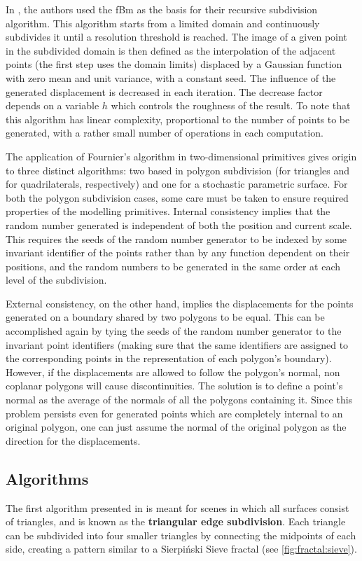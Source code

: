 \documentclass{acmtog}
\begin{document}
In \cite{Fournier82}, the authors used the fBm as the basis for their recursive subdivision algorithm. This algorithm starts from a limited domain and continuously subdivides it until a resolution threshold is reached. The image of a given point in the subdivided domain is then defined as the interpolation of the adjacent points (the first step uses the domain limits) displaced by a Gaussian function with zero mean and unit variance, with a constant seed. The influence of the generated displacement is decreased in each iteration. The decrease factor depends on a variable $h$ which controls the roughness of the result. To note that this algorithm has linear complexity, proportional to the number of points to be generated, with a rather small number of operations in each computation.

The application of Fournier's algorithm in two-dimensional primitives gives origin to three distinct algorithms: two based in polygon subdivision (for triangles and for quadrilaterals, respectively) and one for a stochastic parametric surface. For both the polygon subdivision cases, some care must be taken to ensure required properties of the modelling primitives. Internal consistency implies that the random number generated is independent of both the position and current scale. This requires the seeds of the random number generator to be indexed by some invariant identifier of the points rather than by any function dependent on their positions, and the random numbers to be generated in the same order at each level of the subdivision.

External consistency, on the other hand, implies the displacements for the points generated on a boundary shared by two polygons to be equal. This can be accomplished again by tying the seeds of the random number generator to the invariant point identifiers (making sure that the same identifiers are assigned to the corresponding points in the representation of each polygon's boundary). However, if the displacements are allowed to follow the polygon's normal, non coplanar polygons will cause discontinuities. The solution is to define a point's normal as the average of the normals of all the polygons containing it. Since this problem persists even for generated points which are completely internal to an original polygon, one can just assume the normal of the original polygon as the direction for the displacements.

\subsection{Algorithms}
The first algorithm presented in \cite{Fournier82} is meant for scenes in which all surfaces consist of triangles, and is known as the \textbf{triangular edge subdivision}. Each triangle can be subdivided into four smaller triangles by connecting the midpoints of each side, creating a pattern similar to a Sierpiński Sieve fractal (see \autoref{fig:fractal:sieve}). 
\end{document}
